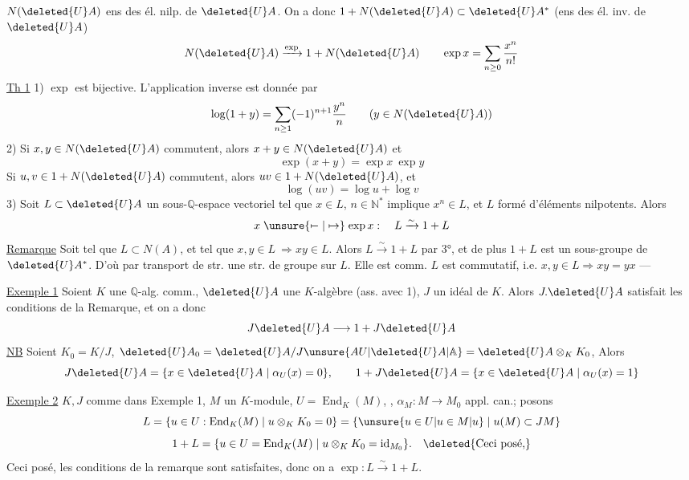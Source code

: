$N(\deleted{U}A)$ ens des él. nilp. de $\deleted{U}A$. On a donc $1+N(\deleted{U}A)\subset\deleted{U}A^*$ (ens des él. inv. de $\deleted{U}A$)
\[
N(\deleted{U}A)\xrightarrow{\exp}1+N(\deleted{U}A)\qquad
\exp x=\sum_{n\geq0}\frac{x^n}{n!}
\]
\uline{Th 1} 1) $\exp$ est bijective. L'application inverse est donnée par
\[
\log(1+y)=\sum_{n\geq1}(-1)^{n+1}\frac{y^n}{n}\qquad(y\in N(\deleted{U}A))
\]
2) Si $x,y\in N(\deleted{U}A)$ commutent, alors $x+y\in N(\deleted{U}A)$ et
\[
\exp(x+y)=\exp x\ \exp y
\]
Si $u,v\in 1+N(\deleted{U}A)$ commutent, alors $uv\in 1+N(\deleted{U}A)$, et
\[
\log(uv)=\log u+\log v
\]
3) Soit $L\subset\deleted{U}A$ un sous-$\mathbb Q$-espace vectoriel tel que $x\in L$, $n\in\mathbb N^*$ implique $x^n\in L$,  et $L$ formé d'éléments nilpotents. Alors
\[
x\mathrel{\unsure{\mapstochar\relbar|\mapsto}}\exp x:\quad L\xrightarrow{\sim}1+L
\]
\uline{Remarque} Soit   tel que $L\subset N(A)$, et tel que $x,y\in L\ \Rightarrow xy\in L$. Alors $L\xrightarrow{\sim}1+L$ par 3°, et de plus $1+L$ est un sous-groupe de $\deleted{U}A^*$. D'où par transport de str. une str. de groupe sur $L$. Elle est comm.  $L$ est commutatif, i.e.  $x,y\in L\Rightarrow xy=yx$ — 

\uline{Exemple 1} Soient $K$ une $\mathbb Q$-alg. comm., $\deleted{U}A$ une $K$-algèbre (ass. avec 1), $J$ un idéal de $K$. Alors $J.\deleted{U}A$ satisfait les conditions de la Remarque, et on a donc
\[
J\deleted{U}A\longrightarrow 1+J\deleted{U}A
\]
\uline{NB} Soient $K_0=K/J$, $\deleted{U}A_0=\deleted{U}A/J\unsure{AU|\deleted{U}A|\mathbb A}=\deleted{U}A\otimes_K K_0$,  Alors 
\[
J\deleted{U}A=\{x\in\deleted{U}A\mid\alpha_U(x)=0\},\qquad
1+J\deleted{U}A=\{x\in\deleted{U}A\mid\alpha_U(x)=1\}
\]

\uline{Exemple 2} $K,J$ comme dans Exemple 1,  $M$ un $K$-module, $U=\operatorname{End}_K(M)$, , $\alpha_M:M\to M_0$ appl. can.; posons 
\[
L=\{u\in U:\operatorname{End}_K(M)\mid u\otimes_K K_0=0\}
=\{\unsure{u\in U|u\in M|u}\mid u(M)\subset JM\}
\]
\[
1+L=\{u\in U=\operatorname{End}_K(M)\mid u\otimes_K K_0=\mathrm{id}_{M_0}\}.
\quad\deleted{\text{Ceci posé,}}
\]
Ceci posé, les conditions de la remarque sont satisfaites, donc on a $\exp:L\xrightarrow{\sim}1+L$.

